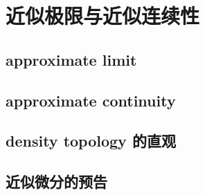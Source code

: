 \section{近似极限与近似连续性}
\label{b1:sec:1405}


\subsection{approximate limit}
\label{b1:subsec:140501}

\subsection{approximate continuity}
\label{b1:subsec:140502}

\subsection{density topology 的直观}
\label{b1:subsec:140503}

\subsection{近似微分的预告}
\label{b1:subsec:140504}


